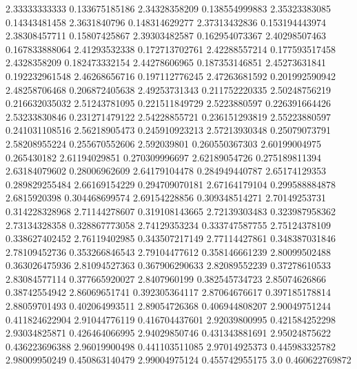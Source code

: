   2.33333333333   0.133675185186
  2.34328358209   0.138554999883
  2.35323383085    0.14343481458
   2.3631840796   0.148314629277
  2.37313432836   0.153194443974
  2.38308457711    0.15807425867
  2.39303482587   0.162954073367
  2.40298507463   0.167833888064
  2.41293532338   0.172713702761
  2.42288557214   0.177593517458
   2.4328358209   0.182473332154
  2.44278606965   0.187353146851
  2.45273631841   0.192232961548
  2.46268656716   0.197112776245
  2.47263681592   0.201992590942
  2.48258706468   0.206872405638
  2.49253731343   0.211752220335
  2.50248756219   0.216632035032
  2.51243781095   0.221511849729
   2.5223880597   0.226391664426
  2.53233830846   0.231271479122
  2.54228855721   0.236151293819
  2.55223880597   0.241031108516
  2.56218905473   0.245910923213
  2.57213930348    0.25079073791
  2.58208955224   0.255670552606
    2.592039801   0.260550367303
  2.60199004975      0.265430182
  2.61194029851   0.270309996697
  2.62189054726   0.275189811394
  2.63184079602    0.28006962609
  2.64179104478   0.284949440787
  2.65174129353   0.289829255484
  2.66169154229   0.294709070181
  2.67164179104   0.299588884878
   2.6815920398   0.304468699574
  2.69154228856   0.309348514271
  2.70149253731   0.314228328968
  2.71144278607   0.319108143665
  2.72139303483   0.323987958362
  2.73134328358   0.328867773058
  2.74129353234   0.333747587755
  2.75124378109   0.338627402452
  2.76119402985   0.343507217149
  2.77114427861   0.348387031846
  2.78109452736   0.353266846543
  2.79104477612   0.358146661239
  2.80099502488   0.363026475936
  2.81094527363   0.367906290633
  2.82089552239    0.37278610533
  2.83084577114   0.377665920027
   2.8407960199   0.382545734723
  2.85074626866    0.38742554942
  2.86069651741   0.392305364117
  2.87064676617   0.397185178814
  2.88059701493   0.402064993511
  2.89054726368   0.406944808207
  2.90049751244   0.411824622904
  2.91044776119   0.416704437601
  2.92039800995   0.421584252298
  2.93034825871   0.426464066995
  2.94029850746   0.431343881691
  2.95024875622   0.436223696388
  2.96019900498   0.441103511085
  2.97014925373   0.445983325782
  2.98009950249   0.450863140479
  2.99004975124   0.455742955175
            3.0   0.460622769872
